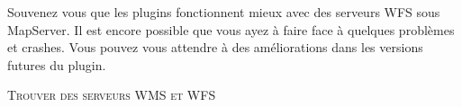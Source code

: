 Souvenez vous que les plugins fonctionnent mieux avec des serveurs WFS sous
MapServer. Il est encore possible que vous ayez à faire face à quelques
problèmes et crashes. Vous pouvez vous attendre à des améliorations dans les
versions futures du plugin.

\begin{Astuce}[ht]\caption{\textsc{Trouver des serveurs WMS et WFS}}
\end{Astuce}